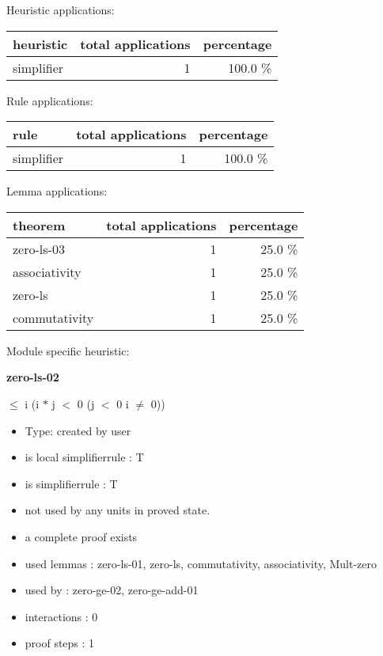 \documentclass[a4paper]{article}
\begin{document}
\medskip


Heuristic applications:

\begin{supertabular}{l|r|r}
heuristic	& total applications & percentage \\ \hline
simplifier & 1 & 100.0 \% \\

\end{supertabular}

Rule applications:

\begin{supertabular}{l|r|r}
rule	        & total applications & percentage \\ \hline
simplifier & 1 & 100.0 \% \\

\end{supertabular}

Lemma applications:

\begin{supertabular}{l|r|r}
theorem	        & total applications & percentage \\ \hline
zero-ls-03 & 1 & 25.0 \% \\
associativity & 1 & 25.0 \% \\
zero-ls & 1 & 25.0 \% \\
commutativity & 1 & 25.0 \% \\

\end{supertabular}

Module specific heuristic:

\pagebreak

{\LARGE\bf zero-ls-02}\label{lemma-zero-ls-02}

\medskip

  $\le$ i \Imp (i $*$ j $<$ 0 \Equiv \Not \Not (j $<$ 0 \And i $\neq$ 0))

\begin{itemize}

\item Type: created by user

\item is local simplifierrule : T
\item is simplifierrule : T
\item not used by any units in proved state.
\item       a complete proof exists
\item       used lemmas  : zero-ls-01, zero-ls, commutativity, associativity, Mult-zero
\item       used by      : zero-ge-02, zero-ge-add-01
\item       interactions : 0
\item       proof steps  : 1
\end{itemize}
\end{document}
